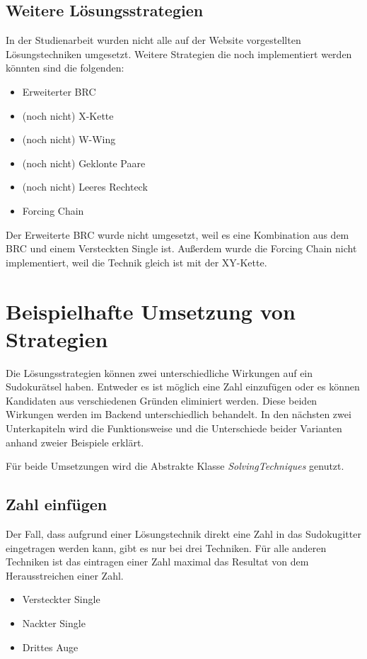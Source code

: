 
\subsection{Weitere Lösungsstrategien}
In der Studienarbeit wurden nicht alle auf der Website \cite{martin} vorgestellten Lösungstechniken umgesetzt. Weitere Strategien die noch implementiert werden könnten sind die folgenden:
\begin{itemize}
	\item Erweiterter \ac{BRC}
	\item (noch nicht) X-Kette
	\item (noch nicht) W-Wing
	\item (noch nicht) Geklonte Paare
	\item (noch nicht) Leeres Rechteck
	\item Forcing Chain
\end{itemize}


Der Erweiterte \ac{BRC} wurde nicht umgesetzt, weil es eine Kombination aus dem \ac{BRC} und einem Versteckten Single ist. Außerdem wurde die Forcing Chain nicht implementiert, weil die Technik gleich ist mit der XY-Kette.

\section{Beispielhafte Umsetzung von Strategien}
Die Lösungsstrategien können zwei unterschiedliche Wirkungen auf ein Sudokurätsel haben. Entweder es ist möglich eine Zahl einzufügen oder es können Kandidaten aus verschiedenen Gründen eliminiert werden. Diese beiden Wirkungen werden im Backend unterschiedlich behandelt. In den nächsten zwei Unterkapiteln wird die Funktionsweise und die Unterschiede beider Varianten anhand zweier Beispiele erklärt. 

Für beide Umsetzungen wird die Abstrakte Klasse \textit{SolvingTechniques} genutzt.

\subsection{Zahl einfügen}

Der Fall, dass aufgrund einer Lösungstechnik direkt eine Zahl in das Sudokugitter eingetragen werden kann, gibt es nur bei drei Techniken. Für alle anderen Techniken ist das eintragen einer Zahl maximal das Resultat von dem Herausstreichen einer Zahl. 
\begin{itemize}
	\item Versteckter Single
	\item Nackter Single
	\item Drittes Auge
\end{itemize}

